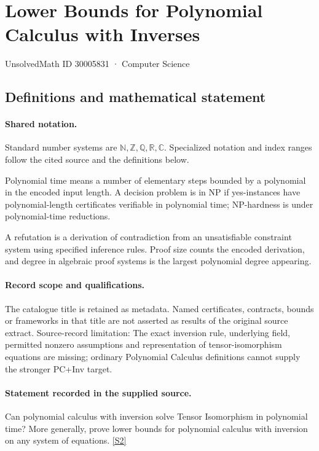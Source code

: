 \documentclass[11pt]{article}
\newcommand{\sref}[2]{\hyperlink{source:#1:#2}{[S#2]}}
\begin{document}
\setcounter{section}{30005830}
\section{Lower Bounds for Polynomial Calculus with Inverses}\label{30005831}
{\small\sffamily UnsolvedMath ID 30005831 · Computer Science}
\subsection{Definitions and mathematical statement}

\paragraph{Shared notation.}Standard number systems are $\mathbb N,\mathbb Z,\mathbb Q,\mathbb R,\mathbb C$. Specialized notation and index ranges follow the cited source and the definitions below.


Polynomial time means a number of elementary steps bounded by a polynomial in the encoded input length. A decision problem is in $\mathrm{NP}$ if yes-instances have polynomial-length certificates verifiable in polynomial time; NP-hardness is under polynomial-time reductions.

A refutation is a derivation of contradiction from an unsatisfiable constraint system using specified inference rules. Proof size counts the encoded derivation, and degree in algebraic proof systems is the largest polynomial degree appearing.
\paragraph{Record scope and qualifications.}
The catalogue title is retained as metadata. Named certificates, contracts, bounds or frameworks in that title are not asserted as results of the original source extract.
Source-record limitation: The exact inversion rule, underlying field, permitted nonzero assumptions and representation of tensor-isomorphism equations are missing; ordinary Polynomial Calculus definitions cannot supply the stronger PC+Inv target.
\paragraph{Statement recorded in the supplied source.}
Can polynomial calculus with inversion solve Tensor Isomorphism in polynomial time? More generally, prove lower bounds for polynomial calculus with inversion on any system of equations. \sref{30005831}{2}
\end{document}
